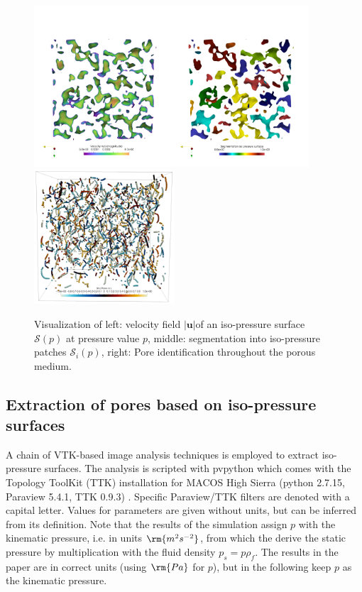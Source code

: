 \documentclass[draft,jgrga]{agutexSI2019}
\begin{document}
\begin{article}
\begin{figure}[htbp!]
\includegraphics[height=6cm]{figures/semgentation_veloctiy_iso_p_surface.png}
\includegraphics[height=5cm]{figures/pores_PM2.png}
\caption{Visualization of left: velocity field $|\mathbf{u}|$of an iso-pressure surface $\mathcal{S}(p)$ at pressure value $p$, middle: segmentation into iso-pressure patches  $\mathcal{S}_i(p)$, right: Pore identification throughout the porous medium. }\label{fig:segmentation}
\end{figure}


\subsection{Extraction of pores based on iso-pressure surfaces}
A chain of VTK-based image analysis techniques  is employed to extract iso-pressure surfaces. The analysis is scripted with pvpython which comes with the Topology ToolKit (TTK) installation for MACOS High Sierra (python 2.7.15, Paraview 5.4.1, TTK 0.9.3) \cite{tierny_topology_2018}. Specific Paraview/TTK filters are denoted with a capital letter. Values for parameters are given without units, but can be inferred from its definition. Note that the results of the simulation assign $p$ with the kinematic pressure, i.e. in units $\rm{m^2s^{-2}}$, from which the derive the static pressure by multiplication with the fluid density $p_s = p\rho_{f}$. The results in the paper are in correct units (using $\rm{Pa}$ for $p$), but in the following keep $p$ as the kinematic pressure. 


\end{article}
\end{document}
